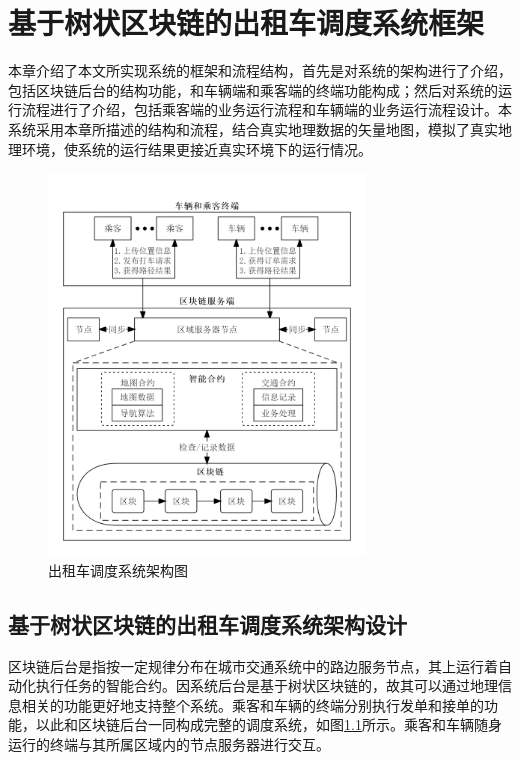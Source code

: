 \chapter{基于树状区块链的出租车调度系统框架}

本章介绍了本文所实现系统的框架和流程结构，首先是对系统的架构进行了介绍，包括区块链后台的结构功能，和车辆端和乘客端的终端功能构成；然后对系统的运行流程进行了介绍，包括乘客端的业务运行流程和车辆端的业务运行流程设计。本系统采用本章所描述的结构和流程，结合真实地理数据的矢量地图，模拟了真实地理环境，使系统的运行结果更接近真实环境下的运行情况。
\begin{figure}
  \centering
  \includegraphics[width=0.75\textwidth]{figures/structure}
  \caption{出租车调度系统架构图}\label{fig:structure}
\end{figure}

\section{基于树状区块链的出租车调度系统架构设计}
区块链后台是指按一定规律分布在城市交通系统中的路边服务节点，其上运行着自动化执行任务的智能合约。因系统后台是基于树状区块链的，故其可以通过地理信息相关的功能更好地支持整个系统。乘客和车辆的终端分别执行发单和接单的功能，以此和区块链后台一同构成完整的调度系统，如图\ref{fig:structure}所示。乘客和车辆随身运行的终端与其所属区域内的节点服务器进行交互。

